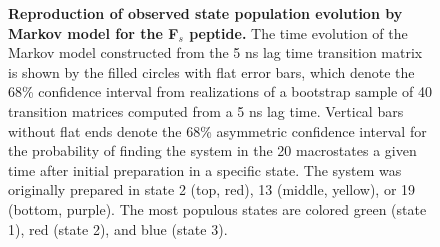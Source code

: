 \begin{figure}[tb]
  \begin{center}
  \end{center}
  \caption{{\bf Reproduction of observed state population evolution by Markov model for the F$_s$ peptide.} 
  The time evolution of the Markov model constructed from the 5 ns lag time transition matrix is shown by the filled circles with flat error bars, which denote the 68\% confidence interval from realizations of a bootstrap sample of 40 transition matrices computed from a 5 ns lag time.
  Vertical bars without flat ends denote the 68\% asymmetric confidence interval for the probability of finding the system in the 20 macrostates a given time after initial preparation in a specific state.
  The system was originally prepared in state 2 (top, red), 13 (middle, yellow), or 19 (bottom, purple).
  The most populous states are colored green (state 1), red (state 2), and blue (state 3).
  }
  \label{figure:fs-time-evolution}
\end{figure}



